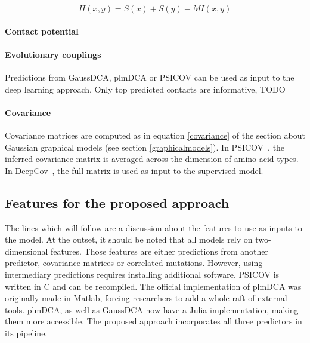             \begin{equation}
                H(x, y) = S(x) + S(y) - MI(x, y)
            \end{equation}

        \paragraph{Contact potential}

            \todo{}

        \paragraph{Evolutionary couplings}

            Predictions from GaussDCA, plmDCA or PSICOV can be used as input to the deep
            learning approach. Only top predicted contacts are informative, TODO

        \paragraph{Covariance}

            Covariance matrices are computed as in equation \ref{covariance} of the section
            about Gaussian graphical models (see section \ref{graphicalmodels}).
            In PSICOV~\cite{doi:10.1093/bioinformatics/btr638}, the inferred covariance
            matrix is averaged across the dimension of amino acid types.
            In DeepCov~\cite{doi:10.1093/bioinformatics/bty341}, the full matrix is used
            as input to the supervised model.

    \subsection{Features for the proposed approach}

        The lines which will follow are a discussion about the features to use as inputs
        to the model. At the outset, it should be noted that all models rely on
        two-dimensional features. Those features are either predictions from another
        predictor, covariance matrices or correlated mutations.
        However, using intermediary predictions requires installing additional software.
        PSICOV is written in C and can be recompiled. The official implementation of
        plmDCA was originally made in Matlab, forcing researchers to add a whole raft
        of external tools. plmDCA, as well as GaussDCA now have a Julia implementation,
        making them more accessible. The proposed approach incorporates all three
        predictors in its pipeline.

